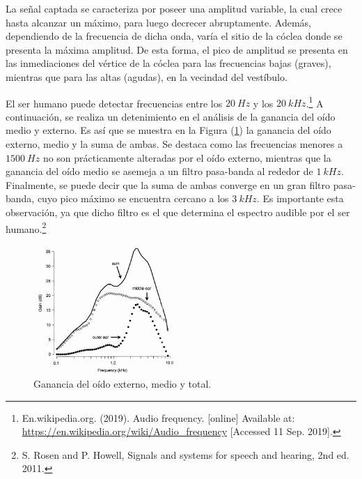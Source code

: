 La señal captada se caracteriza por poseer una amplitud variable, la cual crece hasta alcanzar un máximo, para luego decrecer abruptamente. Además, dependiendo de la frecuencia de dicha onda, varía el sitio de la cóclea donde se presenta la máxima amplitud. De esta forma, el pico de amplitud se presenta en las inmediaciones del vértice de la cóclea para las frecuencias bajas (graves), mientras que para las altas (agudas), en la vecindad del vestíbulo.

El ser humano puede detectar frecuencias entre los $20 \ Hz$ y los $20 \ kHz$.\footnote{En.wikipedia.org. (2019). Audio frequency. [online] Available at: \url{https://en.wikipedia.org/wiki/Audio_frequency} [Accessed 11 Sep. 2019].} A continuación, se realiza un detenimiento en el análisis de la ganancia del oído medio y externo. Es así que se muestra en la Figura (\ref{fig:oidoganancia}) la ganancia del oído externo, medio y la suma de ambas. Se destaca como las frecuencias menores a $1500 \ Hz$ no son prácticamente alteradas por el oído externo, mientras que la ganancia del oído medio se asemeja a un filtro pasa-banda al rededor de $1 \ kHz$. Finalmente, se puede decir que la suma de ambas converge en un gran filtro pasa-banda, cuyo pico máximo se encuentra cercano a los $3 \ kHz$. Es importante esta observación, ya que dicho filtro es el que determina el espectro audible por el ser humano.\footnote{S. Rosen and P. Howell, Signals and systems for speech and hearing, 2nd ed. 2011.}
\begin{figure}[H]
\centering
	\includegraphics[width=0.5\textwidth]{Imagenes/Ganancia-del-oido-externo-y-medio.png}
	\caption{Ganancia del oído externo, medio y total.}
	\label{fig:oidoganancia}
\end{figure}

